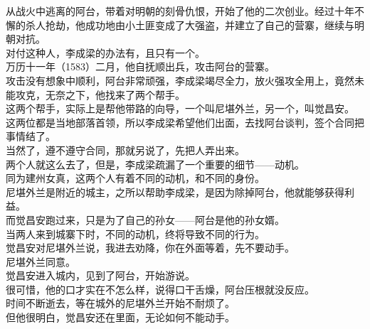 \begin{multicols}{\theparacolNo}
从战火中逃离的阿台，带着对明朝的刻骨仇恨，开始了他的二次创业。经过十年不懈的杀人抢劫，他成功地由小土匪变成了大强盗，并建立了自己的营寨，继续与明朝对抗。\\

对付这种人，李成梁的办法有，且只有一个。\\

万历十一年（1583）二月，他自抚顺出兵，攻击阿台的营寨。\\

攻击没有想象中顺利，阿台非常顽强，李成梁竭尽全力，放火强攻全用上，竟然未能攻克，无奈之下，他找来了两个帮手。\\

这两个帮手，实际上是帮他带路的向导，一个叫尼堪外兰，另一个，叫觉昌安。\\

这两位都是当地部落首领，所以李成梁希望他们出面，去找阿台谈判，签个合同把事情结了。\\

当然了，遵不遵守合同，那就另说了，先把人弄出来。\\

两个人就这么去了，但是，李成梁疏漏了一个重要的细节——动机。\\

同为建州女真，这两个人有着不同的动机，和不同的身份。\\

尼堪外兰是附近的城主，之所以帮助李成梁，是因为除掉阿台，他就能够获得利益。\\

而觉昌安跑过来，只是为了自己的孙女——阿台是他的孙女婿。\\

当两人来到城寨下时，不同的动机，终将导致不同的行为。\\

觉昌安对尼堪外兰说，我进去劝降，你在外面等着，先不要动手。\\

尼堪外兰同意。\\

觉昌安进入城内，见到了阿台，开始游说。\\

很可惜，他的口才实在不怎么样，说得口干舌燥，阿台压根就没反应。\\

时间不断逝去，等在城外的尼堪外兰开始不耐烦了。\\

但他很明白，觉昌安还在里面，无论如何不能动手。\\


\end{multicols}
